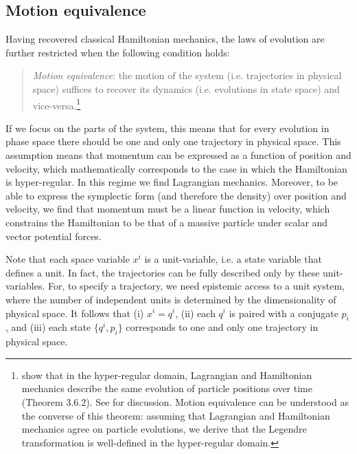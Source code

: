 \documentclass[12pt, twoside]{article}
\newcommand\bs{\begin{singlespace}}
\newcommand\es{\end{singlespace}}
\begin{document}



\subsection{Motion equivalence}
\label{motion}

Having recovered classical Hamiltonian mechanics, the laws of evolution are further restricted when the following condition holds:


\begin{quotation}
\bs \noindent
\textit{Motion equivalence}: the motion of the system (i.e. trajectories in physical space) suffices to recover its dynamics (i.e. evolutions in state space) and vice-versa.\footnote{ \textcites[218]{Abraham} show that in the hyper-regular domain, Lagrangian and Hamiltonian mechanics describe the same evolution of particle positions over time (Theorem 3.6.2). See \textcites[1180-1181]{Barrett2} for discussion. Motion equivalence can be understood as the converse of this theorem: assuming that Lagrangian and Hamiltonian mechanics agree on particle evolutions, we derive that the Legendre transformation is well-defined in the hyper-regular domain.} \es
\end{quotation}


\noindent If we focus on the parts of the system, this means that for every evolution in phase space there should be one and only one trajectory in physical space. This assumption means that momentum can be expressed as a function of position and velocity, which mathematically corresponds to the case in which the Hamiltonian is hyper-regular. In this regime we find Lagrangian mechanics. Moreover, to be able to express the symplectic form (and therefore the density) over position and velocity, we find that momentum must be a linear function in velocity, which constrains the Hamiltonian to be that of a massive particle under scalar and vector potential forces.

Note that each space variable $x^i$ is a unit-variable, i.e. a state variable that defines a unit. In fact, the trajectories can be fully described only by these unit-variables. For, to specify a trajectory, we need epistemic access to a unit system, where the number of independent units is determined by the dimensionality of physical space. It follows that (i) $x^i = q^i$, (ii) each $q^i$ is paired with a conjugate $p_i$, and (iii) each state $\{q^i, p_i\}$ corresponds to one and only one trajectory in physical space. 
\end{document}
